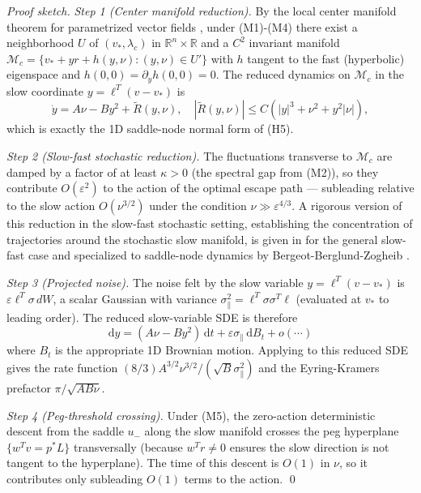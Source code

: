 \documentclass[11pt,a4paper]{article}
\theoremstyle{plain}
\theoremstyle{definition}
\newcommand{\R}{\mathbb{R}}
\newcommand{\eps}{\varepsilon}
\renewcommand{\d}{\mathrm{d}}
\begin{document}
\begin{proof}[Proof sketch]
\textit{Step 1 (Center manifold reduction).} By the local center manifold theorem for parametrized vector fields \cite[Thm~5.1]{KuehnBook2015}, under (M1)-(M4) there exist a neighborhood $U$ of $(v_*,\lambda_c)$ in $\R^n\times\R$ and a $C^2$ invariant manifold $\mathcal M_c = \{v_* + yr + h(y,\nu) : (y,\nu)\in U'\}$ with $h$ tangent to the fast (hyperbolic) eigenspace and $h(0,0) = \partial_y h(0,0) = 0$. The reduced dynamics on $\mathcal M_c$ in the slow coordinate $y = \ell^T(v - v_*)$ is
$$\dot y = A\nu - B y^2 + \tilde R(y,\nu),\quad |\tilde R(y,\nu)| \leq C(|y|^3 + \nu^2 + y^2|\nu|),$$
which is exactly the 1D saddle-node normal form of (H5).

\textit{Step 2 (Slow-fast stochastic reduction).} The fluctuations transverse to $\mathcal M_c$ are damped by a factor of at least $\kappa > 0$ (the spectral gap from (M2)), so they contribute $O(\eps^2)$ to the action of the optimal escape path --- subleading relative to the slow action $O(\nu^{3/2})$ under the condition $\nu \gg \eps^{4/3}$. A rigorous version of this reduction in the slow-fast stochastic setting, establishing the concentration of trajectories around the stochastic slow manifold, is given in \cite[Theorem 5.1.18 (adiabatic version)]{BerglundGentz2006} for the general slow-fast case and specialized to saddle-node dynamics by Bergeot-Berglund-Zogheib \cite{BergeotBerglundZogheib2025}.

\textit{Step 3 (Projected noise).} The noise felt by the slow variable $y = \ell^T(v-v_*)$ is $\eps\ell^T\sigma\,dW$, a scalar Gaussian with variance $\sigma_\|^2 = \ell^T\sigma\sigma^T\ell$ (evaluated at $v_*$ to leading order). The reduced slow-variable SDE is therefore
$$\d y = (A\nu - B y^2)\,\d t + \eps\sigma_\|\,\d B_t + o(\cdots)$$
where $B_t$ is the appropriate 1D Brownian motion. Applying  to this reduced SDE gives the rate function $(8/3) A^{3/2}\nu^{3/2}/(\sqrt B \sigma_\|^2)$ and the Eyring-Kramers prefactor $\pi/\sqrt{AB\nu}$.

\textit{Step 4 (Peg-threshold crossing).} Under (M5), the zero-action deterministic descent from the saddle $u_-$ along the slow manifold crosses the peg hyperplane $\{w^T v = p^* L\}$ transversally (because $w^T r \neq 0$ ensures the slow direction is not tangent to the hyperplane). The time of this descent is $O(1)$ in $\nu$, so it contributes only subleading $O(1)$ terms to the action.
\qed
\end{proof}
\end{document}

